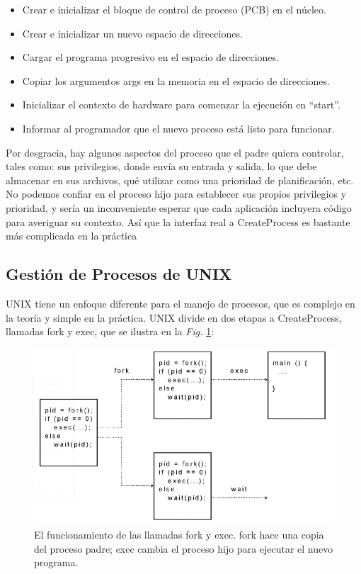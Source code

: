 \documentclass[10pt]{book}
\begin{document}
\begin{itemize}
\item Crear e inicializar el bloque de control de proceso (PCB) en el núcleo.
\item Crear e inicializar un nuevo espacio de direcciones.
\item Cargar el programa progresivo en el espacio de direcciones.
\item Copiar los argumentos {\mf args} en la memoria en el espacio de direcciones.
\item Inicializar el contexto de hardware para comenzar la ejecución en ``{\mf start}''.
\item Informar al programador que el nuevo proceso está listo para funcionar.
\end{itemize}

Por desgracia, hay algunos aspectos del proceso que el padre quiera controlar, tales como: sus privilegios, donde envía su entrada y salida, lo que debe almacenar en sus archivos, qué utilizar como una prioridad de planificación, etc. No podemos confiar en el proceso hijo para establecer sus propios privilegios y prioridad, y sería un inconveniente esperar que cada aplicación incluyera código para averiguar su contexto. Así que la interfaz real a {\mf CreateProcess} es bastante más complicada en la práctica

\subsection{Gestión de Procesos de UNIX}
UNIX tiene un enfoque diferente para el manejo de procesos, que es complejo en la teoría y simple en la práctica. UNIX divide en dos etapas a {\mf CreateProcess}, llamadas {\mf fork} y {\mf exec}, que se ilustra en la \textit{Fig.} \ref{fig0302}:
\begin{figure}[tbhp]
\centerline{\includegraphics[scale=0.45]{img/fig0302}}
\caption{El funcionamiento de las llamadas {\mf fork} y {\mf exec}. {\mf fork} hace una copia del proceso padre; {\mf exec} cambia el proceso hijo para ejecutar el nuevo programa.}
\label{fig0302}
\end{figure}
\end{document}
